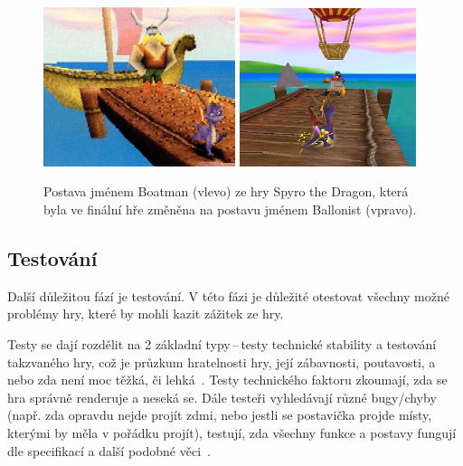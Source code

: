 \begin{figure}[hb]
    \vspace{0.5cm}
    \centering
    \includegraphics[width=0.5\textwidth]{obrazky-figures/ch2/Spyro-Boatman.png}\hspace{0.1cm}
    \includegraphics[width=0.46\textwidth]{obrazky-figures/ch2/Spyro-Ballonist.png}
    \caption{Postava jménem Boatman (vlevo) ze hry Spyro the Dragon, která byla ve finální hře změněna na postavu jménem Ballonist (vpravo).~\cite{GameMaker_development}}
    \label{fig:spyro_cut}
\end{figure}

\subsection*{Testování}
Další důležitou fází je testování. V této fázi je důležité otestovat všechny možné problémy hry, které by mohli kazit zážitek ze hry.

Testy se dají rozdělit na 2 základní typy\,--\,testy technické stability a testování takzvaného  hry, což je průzkum hratelnosti hry, její zábavnosti, poutavosti, a nebo zda není moc těžká, či lehká~\cite{GameMaker_development}. Testy technického faktoru zkoumají, zda se hra správně renderuje a neseká se. Dále testeři vyhledávají různé bugy/chyby (např. zda opravdu nejde projít zdmi, nebo jestli se postavička projde místy, kterými by měla v pořádku projít), testují, zda všechny funkce a postavy fungují dle specifikací a další podobné věci~\cite{g2_game_development}.

